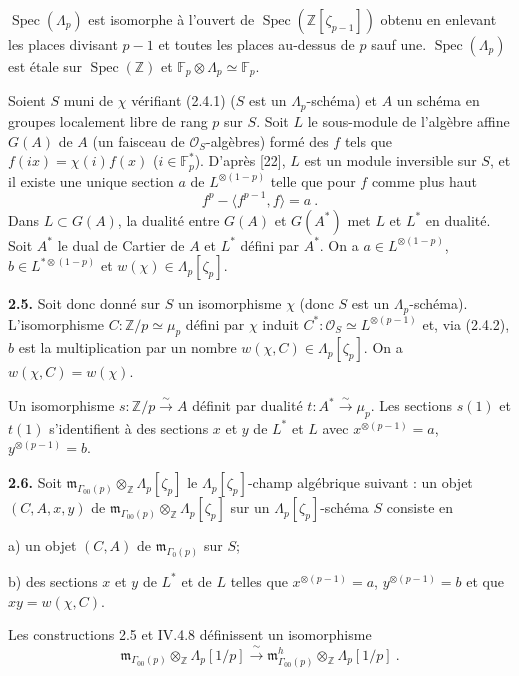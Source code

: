 \documentclass[10pt,a4paper]{amsart}
\theoremstyle{plain}
\theoremstyle{definition}
\DeclareMathOperator{\Spec}{Spec}
\newcommand{\m}{\mathfrak{m}}
\newcommand{\FF}{\mathbb{F}}
\newcommand{\ZZ}{\mathbb{Z}}
\begin{document}
$\Spec(\Lambda_p)$ est isomorphe \`a l'ouvert de $\Spec(\ZZ[\zeta_{p-1}])$ obtenu en enlevant les places divisant $p-1$ et toutes les places au-dessus de $p$ sauf une. $\Spec(\Lambda_p)$ est \'etale sur $\Spec(\ZZ)$ et $\FF_p \otimes \Lambda_p \simeq \FF_p$.

Soient $S$ muni de $\chi$ v\'erifiant (2.4.1) ($S$ est un $\Lambda_p$-sch\'ema) et $A$ un sch\'ema en groupes localement libre de rang $p$ sur $S$. Soit $L$ le sous-module de l'alg\`ebre affine $G(A)$ de $A$ (un faisceau de $\mathcal{O}_S$-alg\`ebres) form\'e des $f$ tels que $f(ix) = \chi(i)f(x)$ ($i \in \FF_p^*$). D'apr\`es [22], $L$ est un module inversible sur $S$, et il existe une unique section $a$ de $L^{\otimes(1-p)}$ telle que pour $f$ comme plus haut
\[
f^p - \langle f^{p-1}, f \rangle = a\ .
\]
Dans $L \subset G(A)$, la dualit\'e entre $G(A)$ et $G(A^*)$ met $L$ et $L^*$ en dualit\'e. Soit $A^*$ le dual de Cartier de $A$ et $L^*$ d\'efini par $A^*$. On a $a \in L^{\otimes(1-p)}$, $b \in L^{*\otimes(1-p)}$ et $w(\chi) \in \Lambda_p[\zeta_p]$.

\medskip\noindent\textbf{2.5.} Soit donc donn\'e sur $S$ un isomorphisme $\chi$ (donc $S$ est un $\Lambda_p$-sch\'ema). L'isomorphisme $C : \ZZ/p \simeq \mu_p$ d\'efini par $\chi$ induit $C^* : \mathcal{O}_S \simeq L^{\otimes(p-1)}$ et, via (2.4.2), $b$ est la multiplication par un nombre $w(\chi,C) \in \Lambda_p[\zeta_p]$. On a $w(\chi,C) = w(\chi)$.

Un isomorphisme $s : \ZZ/p \xrightarrow{\sim} A$ d\'efinit par dualit\'e $t : A^* \xrightarrow{\sim} \mu_p$. Les sections $s(1)$ et $t(1)$ s'identifient \`a des sections $x$ et $y$ de $L^*$ et $L$ avec $x^{\otimes(p-1)} = a$, $y^{\otimes(p-1)} = b$.

\medskip\noindent\textbf{2.6.} Soit $\m_{\Gamma_{00}(p)} \otimes_{\ZZ} \Lambda_p[\zeta_p]$ le $\Lambda_p[\zeta_p]$-champ alg\'ebrique suivant : un objet $(C,A,x,y)$ de $\m_{\Gamma_{00}(p)} \otimes_{\ZZ} \Lambda_p[\zeta_p]$ sur un $\Lambda_p[\zeta_p]$-sch\'ema $S$ consiste en

a) un objet $(C,A)$ de $\m_{\Gamma_0(p)}$ sur $S$;

b) des sections $x$ et $y$ de $L^*$ et de $L$ telles que $x^{\otimes(p-1)} = a$, $y^{\otimes(p-1)} = b$ et que $xy = w(\chi,C)$.

Les constructions 2.5 et IV.4.8 d\'efinissent un isomorphisme
\begin{equation}
\m_{\Gamma_{00}(p)} \otimes_{\ZZ} \Lambda_p[1/p] \xrightarrow{\;\sim\;} \m_{\Gamma_{00}(p)}^h \otimes_{\ZZ} \Lambda_p[1/p]\ .
\end{equation}
\end{document}
